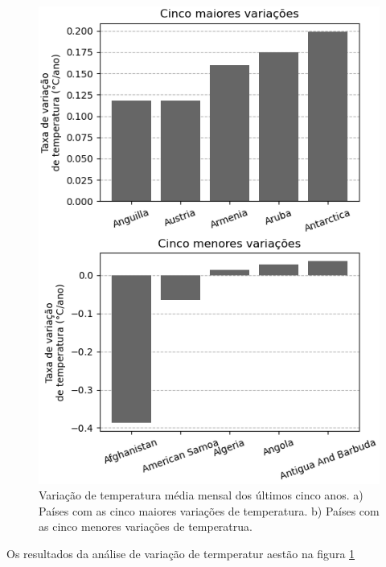 \documentclass{article}
\begin{document}
\begin{figure}
	\includegraphics{../figuras/variacao_temperatura.png}
	\caption{
	Variação de temperatura média mensal dos últimos cinco anos.
	a) Países com as cinco maiores variações de temperatura.
	b) Países com as cinco menores variações de temperatrua.	
	}
	\label{fig:variacao}
\end{figure}

Os resultados da análise de variação de termperatur aestão na figura \ref{fig:variacao}
\end{document}
